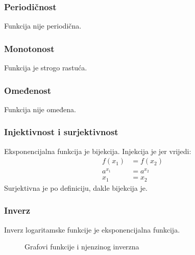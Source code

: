 \subsubsection{Periodičnost \eksp}
    Funkcija nije periodična.

\subsubsection{Monotonost \eksp}
    Funkcija je strogo rastuća.

\subsubsection{Omeđenost \eksp}
    Funkcija nije omeđena.

\subsubsection{Injektivnost i surjektivnost \eksp}
    Eksponencijalna funkcija je bijekcija. Injekcija je jer vrijedi:
    \begin{equation*}
        \begin{split}
            f(x_1)      &= f(x_2) \\
            a^{x_1}     &= a^{x_2} \\
            x_1         &= x_2
        \end{split}
    \end{equation*}
    Surjektivna je po definiciju, dakle bijekcija je.

\subsubsection{Inverz \eksp}
    Inverz logaritamske funkcije je eksponencijalna funkcija.
    \begin{figure}[ht]
        \centering
        \caption{Grafovi funkcije i njenzinog inverzna}
        \label{fig:template}
    \end{figure}
    \\